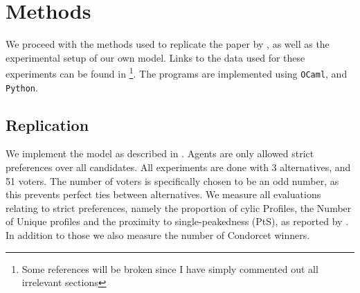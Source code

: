 \chapter{Methods}
\label{Methods}

We proceed with the methods used to replicate the paper by \citet{radDeliberationSinglePeakednessCoherent2021}, as well as the experimental setup of our own model. Links to the data used for these experiments can be found in \footnote{Some references will be broken since I have simply commented out all irrelevant sections}. The programs are implemented using \texttt{OCaml}, and \texttt{Python}.


\section{Replication}
We implement the model as described in . Agents are
only allowed strict preferences over all candidates. All experiments are done
with 3 alternatives, and 51 voters. The number of voters is specifically chosen
to be an odd number, as this prevents perfect ties between alternatives. We
measure all evaluations relating to strict preferences, namely the proportion
of cylic Profiles, the Number of Unique profiles and the proximity to
single-peakedness (PtS), as reported by
\citet{radDeliberationSinglePeakednessCoherent2021}. In addition to those we
also measure the number of Condorcet winners.

